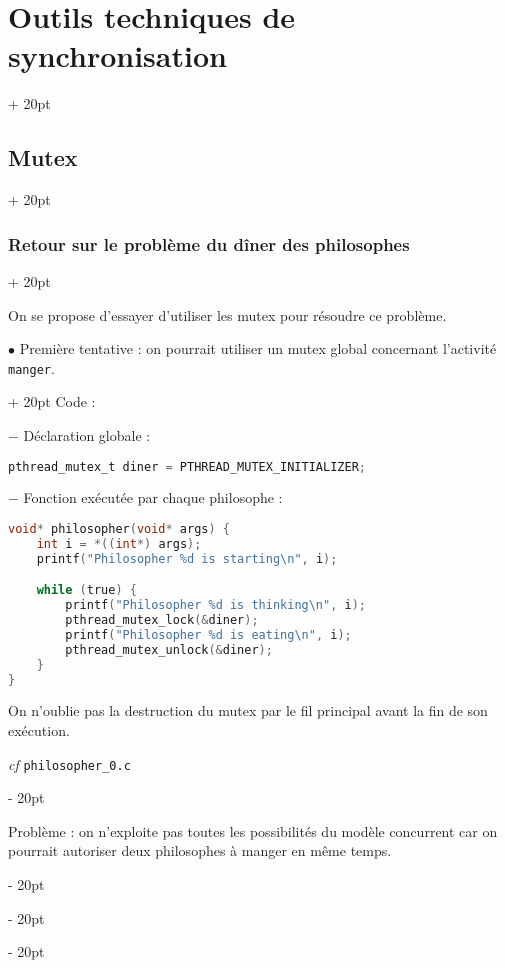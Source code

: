\documentclass[a4paper, 12pt, twoside]{article}
\newcommand{\ind}[1][20pt]{\advance\leftskip + #1}
\newcommand{\deind}[1][20pt]{\advance\leftskip - #1}
\newenvironment{indt}[2][20pt]{#2 \par \ind[#1]}{\par \deind} %
\begin{document}
\begin{indt}{\section{Outils techniques de synchronisation}}
\begin{indt}{\subsection{Mutex}}
            \vspace{12pt}
            
            \begin{indt}{\subsubsection{Retour sur le problème du dîner des philosophes}}
                \label{3.1.4}

                On se propose d'essayer d'utiliser les mutex pour résoudre ce problème.

                \begin{indt}{$\bullet$  Première tentative : on pourrait utiliser un mutex global concernant l'activité \texttt{manger}.}
                    Code :

                    $-$ Déclaration globale :

                    \begin{lstlisting}[language=C, xleftmargin=100pt]
pthread_mutex_t diner = PTHREAD_MUTEX_INITIALIZER;\end{lstlisting}

                    $-$ Fonction exécutée par chaque philosophe :

                    \newpage

                    \begin{lstlisting}[language=C, xleftmargin=100pt]
void* philosopher(void* args) {
    int i = *((int*) args);
    printf("Philosopher %d is starting\n", i);

    while (true) {
        printf("Philosopher %d is thinking\n", i);
        pthread_mutex_lock(&diner);
        printf("Philosopher %d is eating\n", i);
        pthread_mutex_unlock(&diner);
    }
}\end{lstlisting}

                    On n'oublie pas la destruction du mutex par le fil principal avant la fin de son exécution.

                    \textit{cf} \texttt{philosopher\_0.c}
                \end{indt}

                \vspace{12pt}
                
                Problème : on n'exploite pas toutes les possibilités du modèle concurrent car on pourrait autoriser deux philosophes à manger en même temps.

                \vspace{12pt}
                

\end{indt}
\end{indt}
\end{indt}
\end{document}
